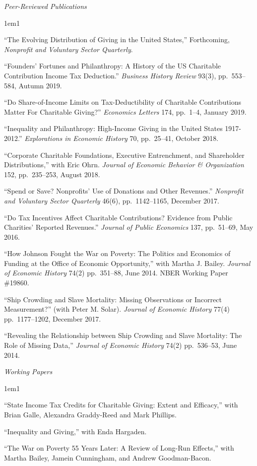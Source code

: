 \documentclass[12pt]{article}
\newcommand{\heading}[1]{
	{\setlength{\parskip}{0.8cm plus6mm minus3mm}
	\parindent=0pt
	\large \textit{{#1}}}
	\vspace{0.1em}
}
\newenvironment{paperlist}{
	\begin{hangparas}{1em}{1}
	\raggedright \setlength{\parindent}{.3em} \setlength{\parskip}{6pt}
}{
	\end{hangparas}
}
\begin{document}
\heading{Peer-Reviewed Publications}

\begin{paperlist}

``The Evolving Distribution of Giving in the United States,'' Forthcoming, \textit{Nonprofit} \textit{and Voluntary Sector Quarterly}.

``Founders' Fortunes and Philanthropy: A History of the US Charitable Contribution Income Tax Deduction.''   \textit{Business History Review} 93(3), pp.\ 553--584, Autumn 2019.

``Do Share-of-Income Limits on Tax-Deductibility of Charitable Contributions Matter For Charitable Giving?'' \textit{Economics Letters} 174, pp.\ 1--4, January 2019.

``Inequality and Philanthropy: High-Income Giving in the United States 1917-2012.''  \textit{Explorations in Economic History} 70, pp.\ 25--41, October 2018.

``Corporate Charitable Foundations, Executive Entrenchment, and Shareholder Distributions,'' with Eric Ohrn.  \textit{Journal of Economic Behavior \& Organization} 152, pp.\ 235--253, August 2018.

``Spend or Save? Nonprofits' Use of Donations and Other Revenues.'' \textit{Nonprofit and Voluntary Sector Quarterly}  46(6), pp.\ 1142--1165, December 2017.

``Do Tax Incentives Affect Charitable Contributions? Evidence from Public Charities' Reported Revenues.'' \textit{Journal of Public Economics} 137, pp.\ 51--69, May 2016.

``How Johnson Fought the War on Poverty: The Politics and Economics of Funding at the Office of Economic Opportunity,'' with Martha J. Bailey. \textit{Journal of Economic History} 74(2) pp.\ 351--88, June 2014.  NBER Working Paper \#19860.

``Ship Crowding and Slave Mortality: Missing Observations or Incorrect Measurement?'' (with Peter M. Solar). \textit{Journal of Economic History} 77(4) pp.\ 1177--1202, December 2017.

``Revealing the Relationship between Ship Crowding and Slave Mortality: The Role of Missing Data,'' \textit{Journal of Economic History} 74(2) pp.\ 536--53, June 2014. 

\end{paperlist}


\heading{Working Papers}

\begin{paperlist}

``State Income Tax Credits for Charitable Giving: Extent and Efficacy,'' with Brian Galle, Alexandra Graddy-Reed and Mark Phillips. 

``Inequality and Giving,'' with Enda Hargaden. 

``The War on Poverty 55 Years Later: A Review of Long-Run Effects,'' with Martha Bailey, Jamein Cunningham, and Andrew Goodman-Bacon.

\end{paperlist}
\end{document}
